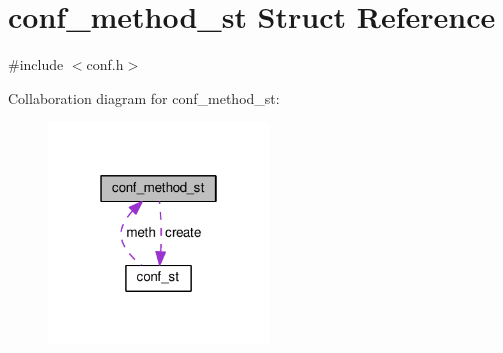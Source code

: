 \hypertarget{structconf__method__st}{}\section{conf\+\_\+method\+\_\+st Struct Reference}
\label{structconf__method__st}


{\ttfamily \#include $<$conf.\+h$>$}



Collaboration diagram for conf\+\_\+method\+\_\+st\+:
\nopagebreak
\begin{figure}[H]
\begin{center}
\leavevmode
\includegraphics[width=166pt]{structconf__method__st__coll__graph}
\end{center}
\end{figure}

